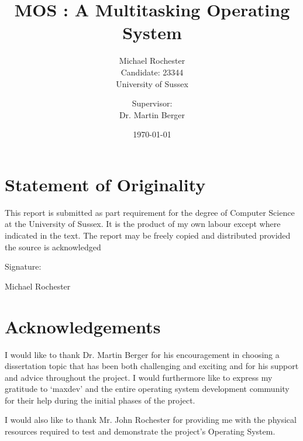 \documentclass[a4paper]{report}
\title{MOS : A Multitasking Operating System}
\date{\today}
\author{Michael Rochester\\ Candidate: 23344\\ University of Sussex
        \and Supervisor:\\ Dr. Martin Berger}
\newcommand\blankpage{%
    \null
    \thispagestyle{empty}%
    \addtocounter{page}{-1}%
    \newpage}
\begin{document}
\titlespacing*{\chapter}{0pt}{-50pt}{20pt}
\titleformat{\chapter}[display]{\normalfont\huge\bfseries}{\chaptertitlename\ \thechapter}{20pt}{\Huge}


\maketitle





\blankpage

\clearpage
\section*{Statement of Originality}
This report is submitted as part requirement for the degree of Computer Science at the University of Sussex. It is the product of my own labour except where indicated in the text. The report may be freely copied and distributed provided the source is acknowledged


\vspace{5mm}
Signature:


\vspace{20mm}
Michael Rochester

\clearpage


\blankpage

\clearpage
\section*{Acknowledgements}

I would like to thank Dr. Martin Berger for his encouragement in choosing a dissertation topic that has been both challenging and exciting and for his support and advice throughout the project. I would furthermore like to express my gratitude to `maxdev' and the entire operating system development community for their help during the initial phases of the project.

I would also like to thank Mr. John Rochester for providing me with the physical resources required to test and demonstrate the project's Operating System.

\clearpage


\blankpage
\end{document}
